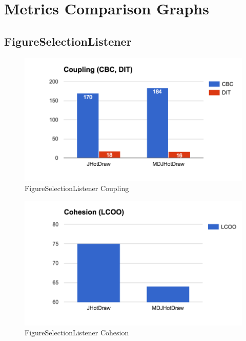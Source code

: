 \section{Metrics Comparison Graphs}\label{Metrics Comparison Graphs}

\subsection{FigureSelectionListener}

\begin{figure}[H]
	\centering
	\includegraphics[scale=0.82]{figures/metrics/Metric_Observer_Coupling.png}
	\caption{FigureSelectionListener Coupling}
  	\label{fig:FigureSelectionListener Coupling}
\end{figure}

\begin{figure}[H]
	\centering
	\includegraphics[scale=0.82]{figures/metrics/Metric_Observer_Cohesion.png}
	\caption{FigureSelectionListener Cohesion}
  	\label{fig:FigureSelectionListener Cohesion}
\end{figure}

